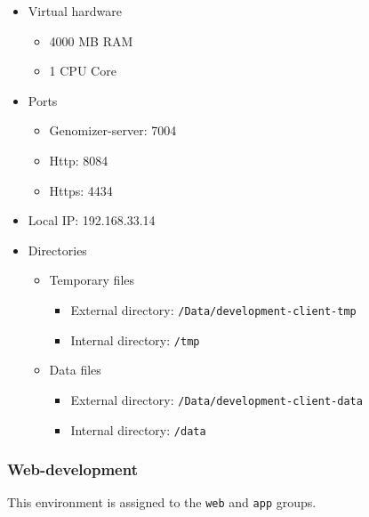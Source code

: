 \begin{itemize}
\itemsep1pt\parskip0pt
\item
  Virtual hardware

  \begin{itemize}
  \itemsep1pt\parskip0pt
  \item
    4000 MB RAM
  \item
    1 CPU Core
  \end{itemize}
\item
  Ports

  \begin{itemize}
  \itemsep1pt\parskip0pt
  \item
    Genomizer-server: 7004
  \item
    Http: 8084
  \item
    Https: 4434
  \end{itemize}
\item
  Local IP: 192.168.33.14
\item
  Directories

  \begin{itemize}
  \itemsep1pt\parskip0pt
  \item
    Temporary files

    \begin{itemize}
    \itemsep1pt\parskip0pt
    \item
      External directory: \texttt{/Data/development-client-tmp}
    \item
      Internal directory: \texttt{/tmp}
    \end{itemize}
  \item
    Data files

    \begin{itemize}
    \itemsep1pt\parskip0pt
    \item
      External directory: \texttt{/Data/development-client-data}
    \item
      Internal directory: \texttt{/data}
    \end{itemize}
  \end{itemize}
\end{itemize}

\subsubsection{Web-development}\label{web-development}

This environment is assigned to the \texttt{web} and \texttt{app}
groups.

